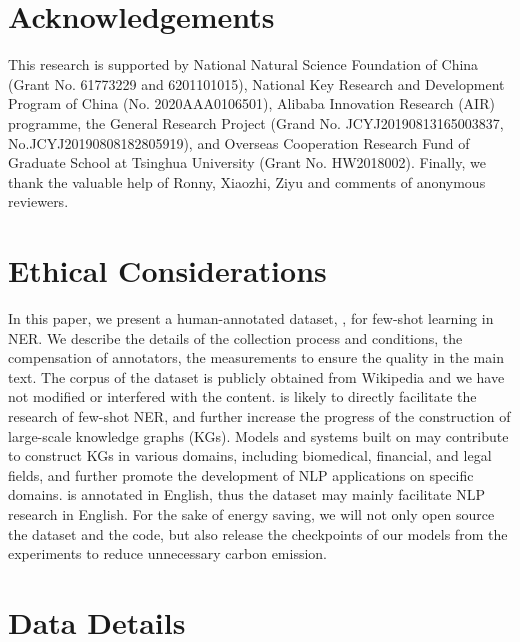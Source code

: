 \documentclass[11pt,a4paper, dvipsnames]{article}
\begin{document}
\section*{Acknowledgements}

This research is supported by  National Natural Science Foundation of China (Grant No. 61773229 and 6201101015),  National Key Research and Development Program of China (No. 2020AAA0106501), Alibaba Innovation Research (AIR) programme, the General Research Project (Grand No. JCYJ20190813165003837, No.JCYJ20190808182805919), and Overseas Cooperation Research Fund of Graduate School at Tsinghua University (Grant No. HW2018002). Finally, we thank the valuable help of Ronny, Xiaozhi, Ziyu and comments of anonymous reviewers.





\section*{Ethical Considerations}
In this paper, we present a human-annotated dataset, , for few-shot learning in NER. We describe the details of the collection process and conditions, the compensation of annotators, the measurements to ensure the quality in the main text. The corpus of the dataset is publicly obtained from Wikipedia and we have not modified or interfered with the content.
 is likely to directly facilitate the research of few-shot NER, and further increase the progress of the construction of large-scale knowledge graphs (KGs). Models and systems built on  may contribute to construct  KGs in various domains, including biomedical, financial, and legal fields, and further promote the development of NLP applications on specific domains. 
 is annotated in  English, thus the dataset may mainly facilitate NLP research in English. For the sake of energy saving, we will not only open source the dataset and the code, but also release the checkpoints of our models from the experiments to reduce unnecessary carbon emission.










\clearpage
\appendix
\section{Data Details}
\end{document}
